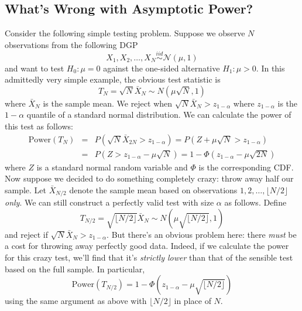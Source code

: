 \documentclass[12pt]{article}
\theoremstyle{definition}
\begin{document}
\subsection{What's Wrong with Asymptotic Power?}
Consider the following simple testing problem. Suppose we observe $N$ observations from the following DGP
$$X_1, X_2, \hdots, X_{N} \overset{iid}{\sim} \mathcal{N}(\mu, 1)$$
and want to test $H_0\colon \mu = 0$ against the one-sided alternative $H_1\colon \mu >0$. In this admittedly very simple example, the obvious test statistic is 
	$$T_{N} = \sqrt{N} \bar{X}_{N} \sim N\left(\mu \sqrt{N}, 1\right)$$
where $\bar{X}_{N}$ is the sample mean. We reject when $\sqrt{N} \bar{X}_{N}>z_{1-\alpha}$ where $z_{1-\alpha}$ is the $1-\alpha$ quantile of a standard normal distribution. We can calculate the power of this test as follows:
\begin{eqnarray*}
\mbox{Power}(T_{N}) &=& P\left(\sqrt{N} \bar{X}_{2N}>z_{1-\alpha}\right) = P\left(Z + \mu\sqrt{N} >z_{1-\alpha}\right)\\
	&=&P\left(Z >z_{1-\alpha} - \mu\sqrt{N}\right) = 1 - \Phi\left(z_{1-\alpha} - \mu\sqrt{2N}\right)
\end{eqnarray*}
where $Z$ is a standard normal random variable and $\Phi$ is the corresponding CDF. Now suppose we decided to do something completely crazy: throw away half our sample. Let $\bar{X}_{N/2}$ denote the sample mean based on observations $1, 2, \hdots, \lfloor N/2 \rfloor $ \emph{only}. We can still construct a perfectly valid test with size $\alpha$ as follows. Define
	$$T_{N/2} = \sqrt{\lfloor N/2 \rfloor } \bar{X}_N \sim N\left(\mu \sqrt{\lfloor N/2 \rfloor }, 1\right)$$
and reject if $\sqrt{N} \bar{X}_N > z_{1-\alpha}$. But there's an obvious problem here: there \emph{must} be a cost for throwing away perfectly good data. Indeed, if we calculate the power for this crazy test, we'll find that it's \emph{strictly lower} than that of the sensible test based on the full sample. In particular,
	$$\mbox{Power}(T_{N/2}) = 1 - \Phi\left(z_{1-\alpha} - \mu\sqrt{\lfloor N/2 \rfloor }\right)$$
using the same argument as above with $\lfloor N/2 \rfloor $ in place of $N$.  
\end{document}
